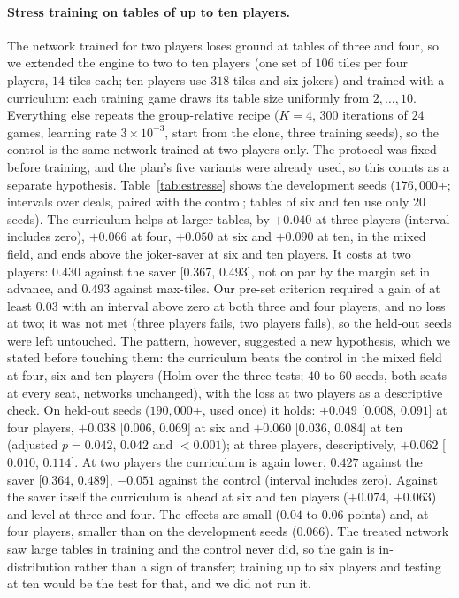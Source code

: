 \documentclass[11pt]{article}
\begin{document}
\paragraph{Stress training on tables of up to ten players.}\label{sec:estresse} The network trained for two players loses ground at tables of three and four, so we extended the engine to two to ten players (one set of $106$ tiles per four players, $14$ tiles each; ten players use $318$ tiles and six jokers) and trained with a curriculum: each training game draws its table size uniformly from $2,\dots,10$. Everything else repeats the group-relative recipe ($K=4$, $300$ iterations of $24$ games, learning rate $3\times10^{-3}$, start from the clone, three training seeds), so the control is the same network trained at two players only. The protocol was fixed before training, and the plan's five variants were already used, so this counts as a separate hypothesis. Table~\ref{tab:estresse} shows the development seeds ($176{,}000$+; intervals over deals, paired with the control; tables of six and ten use only $20$ seeds). The curriculum helps at larger tables, by $+0.040$ at three players (interval includes zero), $+0.066$ at four, $+0.050$ at six and $+0.090$ at ten, in the mixed field, and ends above the joker-saver at six and ten players. It costs at two players: $0.430$ against the saver [$0.367$, $0.493$], not on par by the margin set in advance, and $0.493$ against max-tiles. Our pre-set criterion required a gain of at least $0.03$ with an interval above zero at both three and four players, and no loss at two; it was not met (three players fails, two players fails), so the held-out seeds were left untouched. The pattern, however, suggested a new hypothesis, which we stated before touching them: the curriculum beats the control in the mixed field at four, six and ten players (Holm over the three tests; $40$ to $60$ seeds, both seats at every seat, networks unchanged), with the loss at two players as a descriptive check. On held-out seeds ($190{,}000$+, used once) it holds: $+0.049$ [$0.008$, $0.091$] at four players, $+0.038$ [$0.006$, $0.069$] at six and $+0.060$ [$0.036$, $0.084$] at ten (adjusted $p=0.042$, $0.042$ and $<0.001$); at three players, descriptively, $+0.062$ [$0.010$, $0.114$]. At two players the curriculum is again lower, $0.427$ against the saver [$0.364$, $0.489$], $-0.051$ against the control (interval includes zero). Against the saver itself the curriculum is ahead at six and ten players ($+0.074$, $+0.063$) and level at three and four. The effects are small ($0.04$ to $0.06$ points) and, at four players, smaller than on the development seeds ($0.066$). The treated network saw large tables in training and the control never did, so the gain is in-distribution rather than a sign of transfer; training up to six players and testing at ten would be the test for that, and we did not run it.
\end{document}

